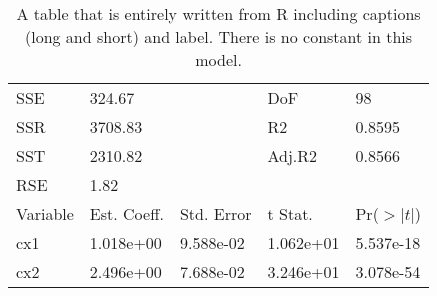 \begin{table}[h!]
\caption[OLS table all from R, no Constant]{A table that is entirely written from R including captions (long and short) and label. There is no constant in this model.}\label{ols3}\begin{center}
\begin{tabular}{l l l l l}

\hline
SSE	&	324.67	&		&	DoF	&	98\\ 
SSR	&	3708.83	&		&	R2	&	0.8595\\ 
SST	&	2310.82	&		&	Adj.R2	&	0.8566\\ 
RSE	&	1.82	&		&		&	\\ 
\hline
Variable	&	Est. Coeff.	&	Std. Error	&	t Stat.	&	Pr($>|t|$)\\ 
\hline
cx1	&	1.018e+00	&	9.588e-02	&	1.062e+01	&	5.537e-18\\ 
cx2	&	2.496e+00	&	7.688e-02	&	3.246e+01	&	3.078e-54\\ 
\hline\end{tabular}
\end{center}
\end{table}